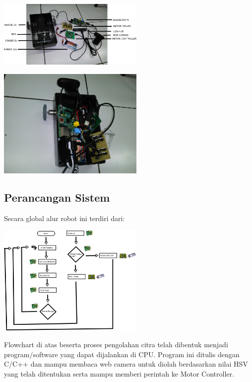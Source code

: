 \documentclass[10pt,journal,compsoc]{IEEEtran}
\begin{document}
  \begin{center}
    \includegraphics[width=200pt]{appart}\\
  \end{center}
  
  \begin{center}
    \includegraphics[width=200pt]{full}\\
  \end{center}
  
  \subsection{Perancangan Sistem}
  Secara global alur robot ini terdiri dari:\\

  \begin{center}
    \includegraphics[width=200pt]{process}\\
  \end{center}
  
  Flowchart di atas beserta proses pengolahan citra telah dibentuk menjadi program/software yang dapat dijalankan di CPU.
  Program ini ditulis dengan C/C++ dan mampu membaca web camera untuk diolah berdasarkan nilai HSV yang telah ditentukan serta mampu memberi perintah ke Motor Controller.
  
\end{document}
